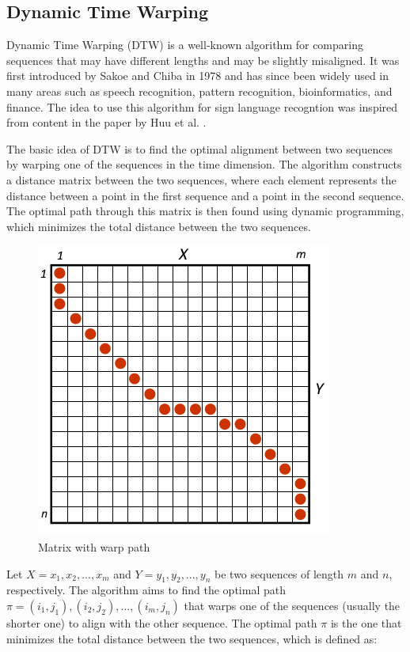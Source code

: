 \documentclass[final,rdr32.tex]{subfiles}
\begin{document}
\subsection{Dynamic Time Warping}

Dynamic Time Warping (DTW) is a well-known algorithm for comparing sequences that may have different lengths and may be slightly misaligned. It was first introduced by Sakoe and Chiba in 1978 \cite{sakoe1978dynamic} and has since been widely used in many areas such as speech recognition, pattern recognition, bioinformatics, and finance. The idea to use this algorithm for sign language recogntion was inspired from content in the paper by Huu et al. \cite{huu2014human}.

The basic idea of DTW is to find the optimal alignment between two sequences by warping one of the sequences in the time dimension. The algorithm constructs a distance matrix between the two sequences, where each element represents the distance between a point in the first sequence and a point in the second sequence. The optimal path through this matrix is then found using dynamic programming, which minimizes the total distance between the two sequences.

\begin{figure}
    \begin{center}
        \includegraphics[scale=0.8]{images/DTW.png}
        \caption[caption]{Matrix with warp path}
    \end{center}
\end{figure}


Let $X = {x_1, x_2, ..., x_{m}}$ and $Y = {y_1, y_2, ..., y_{n}}$ be two sequences of length $m$ and $n$, respectively. The algorithm aims to find the optimal path $\pi = {(i_1,j_1),(i_2,j_2),...,(i_m,j_n)}$ that warps one of the sequences (usually the shorter one) to align with the other sequence. The optimal path $\pi$ is the one that minimizes the total distance between the two sequences, which is defined as:
\end{document}
